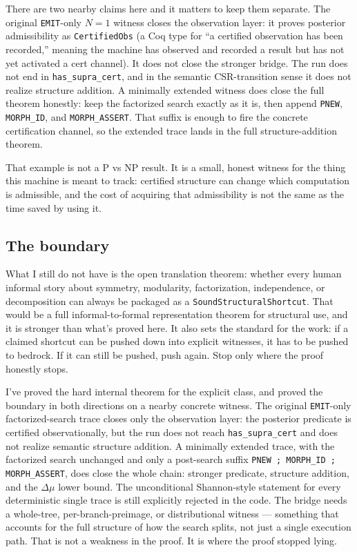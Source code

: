 \documentclass[11pt,a4paper]{article}
\theoremstyle{plain}
\theoremstyle{definition}
\theoremstyle{remark}
\begin{document}
There are two nearby claims here and it matters to keep them separate. The original \texttt{EMIT}-only $N=1$ witness closes the observation layer: it proves posterior admissibility as \texttt{CertifiedObs} (a Coq type for ``a certified observation has been recorded,'' meaning the machine has observed and recorded a result but has not yet activated a cert channel). It does not close the stronger bridge. The run does not end in \texttt{has\_supra\_cert}, and in the semantic CSR-transition sense it does not realize structure addition. A minimally extended witness does close the full theorem honestly: keep the factorized search exactly as it is, then append \texttt{PNEW}, \texttt{MORPH\_ID}, and \texttt{MORPH\_ASSERT}. That suffix is enough to fire the concrete certification channel, so the extended trace lands in the full structure-addition theorem.

That example is not a P vs NP result. It is a small, honest witness for the thing this machine is meant to track: certified structure can change which computation is admissible, and the cost of acquiring that admissibility is not the same as the time saved by using it.

\subsection{The boundary}

What I still do not have is the open translation theorem: whether every human informal story about symmetry, modularity, factorization, independence, or decomposition can always be packaged as a \texttt{SoundStructuralShortcut}. That would be a full informal-to-formal representation theorem for structural use, and it is stronger than what's proved here. It also sets the standard for the work: if a claimed shortcut can be pushed down into explicit witnesses, it has to be pushed to bedrock. If it can still be pushed, push again. Stop only where the proof honestly stops.

I've proved the hard internal theorem for the explicit class, and proved the boundary in both directions on a nearby concrete witness. The original \texttt{EMIT}-only factorized-search trace closes only the observation layer: the posterior predicate is certified observationally, but the run does not reach \texttt{has\_supra\_cert} and does not realize semantic structure addition. A minimally extended trace, with the factorized search unchanged and only a post-search suffix \texttt{PNEW ; MORPH\_ID ; MORPH\_ASSERT}, does close the whole chain: stronger predicate, structure addition, and the $\Delta\mu$ lower bound. The unconditional Shannon-style statement for every deterministic single trace is still explicitly rejected in the code. The bridge needs a whole-tree, per-branch-preimage, or distributional witness --- something that accounts for the full structure of how the search splits, not just a single execution path. That is not a weakness in the proof. It is where the proof stopped lying.
\end{document}
